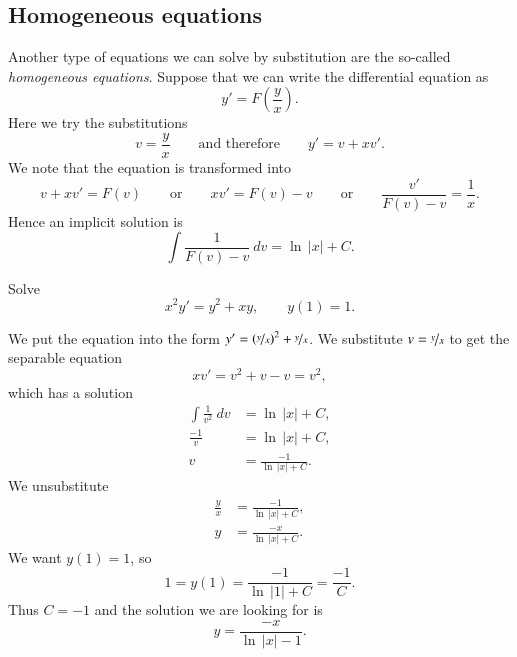 \documentclass[12pt]{book}
\begin{document}
\subsection{Homogeneous equations}

Another type of equations we can solve by substitution are the 
so-called \emph{homogeneous equations}.
Suppose that we can write the differential equation as
\begin{equation*}
y' = F\left(\frac{y}{x}\right) .
\end{equation*}
Here we try the substitutions
\begin{equation*}
v = \frac{y}{x} \qquad \text{and therefore} \qquad y' = v + x v' .
\end{equation*}
We note that the equation is transformed into
\begin{equation*}
v+ xv' = F(v) \qquad \text{or} \qquad xv' = F(v)-v 
\qquad \text{or} \qquad \frac{v'}{F(v)-v} = \frac{1}{x} .
\end{equation*}
Hence an implicit solution is
\begin{equation*}
\int \frac{1}{F(v)-v} ~dv = \ln \, \lvert x \rvert + C .
\end{equation*}

\begin{example}
Solve 
\begin{equation*}
x^2y' = y^2+xy, \qquad y(1)=1.
\end{equation*}

We put the equation into
the form $y'= {\left(\nicefrac{y}{x}\right)}^2+\nicefrac{y}{x}$.  We 
substitute $v=\nicefrac{y}{x}$ to get
the separable equation
\begin{equation*}
xv' = v^2+v-v = v^2 ,
\end{equation*}
which has a solution
\begin{align*}
\int \frac{1}{v^2} ~dv &= \ln \, \lvert x \rvert + C , \\
\frac{-1}{v} &= \ln \, \lvert x \rvert + C , \\
v &= \frac{-1}{\ln \, \lvert x \rvert + C} .
\end{align*}
We unsubstitute
\begin{align*}
\frac{y}{x} &= \frac{-1}{\ln \, \lvert x \rvert + C} , \\
y &= \frac{-x}{\ln \, \lvert x \rvert + C} .
\end{align*}
We want $y(1)=1$, so 
\begin{equation*}
1 = y(1) = \frac{-1}{\ln \, \lvert 1 \rvert + C} = \frac{-1}{C} .
\end{equation*}
Thus $C = -1$ and
the solution we are looking for is
\begin{equation*}
y = \frac{-x}{\ln \, \lvert x \rvert -1} .
\end{equation*}
\end{example}
\end{document}
